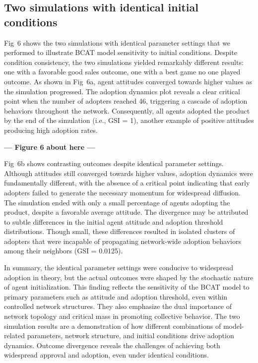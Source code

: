 \documentclass[10pt,letterpaper]{article}
\begin{document}
\subsection*{Two simulations with identical initial conditions}

Fig~6 shows the two simulations with identical parameter settings that we performed to illustrate BCAT model sensitivity to initial conditions. Despite condition consistency, the two simulations yielded remarkably different results: one with a favorable good sales outcome, one with a best game no one played outcome. As shown in Fig~6a, agent attitudes converged towards higher values as the simulation progressed. The adoption dynamics plot reveals a clear critical point when the number of adopters reached 46, triggering a cascade of adoption behaviors throughout the network. Consequently, all agents adopted the product by the end of the simulation (i.e., GSI = 1), another example of positive attitudes producing high adoption rates.



\begin{center}\textbf{--- Figure 6 about here ---}\end{center}


Fig~6b shows contrasting outcomes despite identical parameter settings. Although attitudes still converged towards higher values, adoption dynamics were fundamentally different, with the absence of a critical point indicating that early adopters failed to generate the necessary momentum for widespread diffusion. The simulation ended with only a small percentage of agents adopting the product, despite a favorable average attitude. The divergence may be attributed to subtle differences in the initial agent attitude and adoption threshold distributions. Though small, these differences resulted in isolated clusters of adopters that were incapable of propagating network-wide adoption behaviors among their neighbors (GSI = 0.0125).

In summary, the identical parameter settings were conducive to widespread adoption in theory, but the actual outcomes were shaped by the stochastic nature of agent initialization. This finding reflects the sensitivity of the BCAT model to primary parameters such as attitude and adoption threshold, even within controlled network structures. They also emphasize the dual importance of network topology and critical mass in promoting collective behavior. The two simulation results are a demonstration of how different combinations of model-related parameters, network structure, and initial conditions drive adoption dynamics. Outcome divergence reveals the challenges of achieving both widespread approval and adoption, even under identical conditions.
\end{document}
